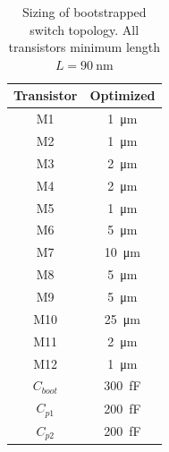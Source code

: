 \documentclass[10pt,journal]{IEEEtran}\usepackage{longtable}
\newcommand{\rowstyle}[1]{\gdef\currentrowstyle{#1}%
  #1\ignorespaces
}
\begin{document}
\begin{table}[hb]
\caption{Sizing of bootstrapped switch topology. All transistors minimum length $L=\SI{90}{\nano\metre}$}
\begin{center}
\begin{tabular}{c|c}
\hline \rowstyle{\bfseries} Transistor & \rowstyle{\bfseries} Optimized  \\ \hline
M1 & \SI{1}{\micro\metre}  \\ \hline
M2 & \SI{1}{\micro\metre}  \\ \hline
M3 & \SI{2}{\micro\metre}  \\ \hline
M4 & \SI{2}{\micro\metre}  \\ \hline
M5 & \SI{1}{\micro\metre}  \\ \hline
M6 & \SI{5}{\micro\metre}  \\ \hline
M7 & \SI{10}{\micro\metre}  \\ \hline
M8 & \SI{5}{\micro\metre}  \\ \hline
M9 & \SI{5}{\micro\metre}  \\ \hline
M10 & \SI{25}{\micro\metre}  \\ \hline
M11 & \SI{2}{\micro\metre}  \\ \hline
M12 & \SI{1}{\micro\metre}  \\ \hline
$C_{boot}$ & \SI{300}{\femto\farad}  \\ \hline
$C_{p1}$ & \SI{200}{\femto\farad}  \\ \hline
$C_{p2}$ & \SI{200}{\femto\farad}  \\ \hline
\end{tabular}
\end{center}
\label{tbl:BootstrappedDesign}
\end{table}




\end{document}
